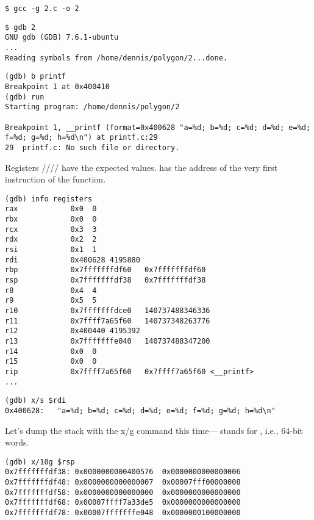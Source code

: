 \begin{lstlisting}
$ gcc -g 2.c -o 2
\end{lstlisting}

\begin{lstlisting}
$ gdb 2
GNU gdb (GDB) 7.6.1-ubuntu
...
Reading symbols from /home/dennis/polygon/2...done.
\end{lstlisting}

\begin{lstlisting}[caption=let's set the breakpoint to \printf{,} and run]
(gdb) b printf
Breakpoint 1 at 0x400410
(gdb) run
Starting program: /home/dennis/polygon/2 

Breakpoint 1, __printf (format=0x400628 "a=%d; b=%d; c=%d; d=%d; e=%d; f=%d; g=%d; h=%d\n") at printf.c:29
29	printf.c: No such file or directory.
\end{lstlisting}

Registers \RSI/\RDX/\RCX// have the expected values.
\RIP has the address of the very first instruction of the \printf function.

\begin{lstlisting}
(gdb) info registers
rax            0x0	0
rbx            0x0	0
rcx            0x3	3
rdx            0x2	2
rsi            0x1	1
rdi            0x400628	4195880
rbp            0x7fffffffdf60	0x7fffffffdf60
rsp            0x7fffffffdf38	0x7fffffffdf38
r8             0x4	4
r9             0x5	5
r10            0x7fffffffdce0	140737488346336
r11            0x7ffff7a65f60	140737348263776
r12            0x400440	4195392
r13            0x7fffffffe040	140737488347200
r14            0x0	0
r15            0x0	0
rip            0x7ffff7a65f60	0x7ffff7a65f60 <__printf>
...
\end{lstlisting}

\begin{lstlisting}[caption=let's inspect the format string]
(gdb) x/s $rdi
0x400628:	"a=%d; b=%d; c=%d; d=%d; e=%d; f=%d; g=%d; h=%d\n"
\end{lstlisting}

Let's dump the stack with the x/g command this time--- stands for , i.e., 64-bit words.

\begin{lstlisting}
(gdb) x/10g $rsp
0x7fffffffdf38:	0x0000000000400576	0x0000000000000006
0x7fffffffdf48:	0x0000000000000007	0x00007fff00000008
0x7fffffffdf58:	0x0000000000000000	0x0000000000000000
0x7fffffffdf68:	0x00007ffff7a33de5	0x0000000000000000
0x7fffffffdf78:	0x00007fffffffe048	0x0000000100000000
\end{lstlisting}

